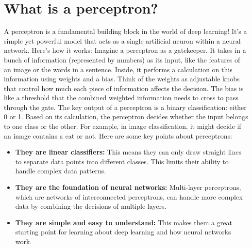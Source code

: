 \section{What is a perceptron?}

    A perceptron is a fundamental building block in the world of deep learning! It's a simple yet powerful model that acts as a single artificial neuron within a neural network. Here's how it works:
    Imagine a perceptron as a gatekeeper. It takes in a bunch of information (represented by numbers) as its input, like the features of an image or the words in a sentence. Inside, it performs a calculation on this information using weights and a bias. Think of the weights as adjustable knobs that control how much each piece of information affects the decision. The bias is like a threshold that the combined weighted information needs to cross to pass through the gate.
    The key output of a perceptron is a binary classification: either 0 or 1. Based on its calculation, the perceptron decides whether the input belongs to one class or the other. For example, in image classification, it might decide if an image contains a cat or not.
    Here are some key points about perceptrons:
        \begin{itemize}
            \item \textbf{They are linear classifiers:} This means they can only draw straight lines to separate data points into different classes. This limits their ability to handle complex data patterns.
            \item \textbf{They are the foundation of neural networks:} Multi-layer perceptrons, which are networks of interconnected perceptrons, can handle more complex data by combining the decisions of multiple layers.
            \item \textbf{They are simple and easy to understand:} This makes them a great starting point for learning about deep learning and how neural networks work.
        \end{itemize}

